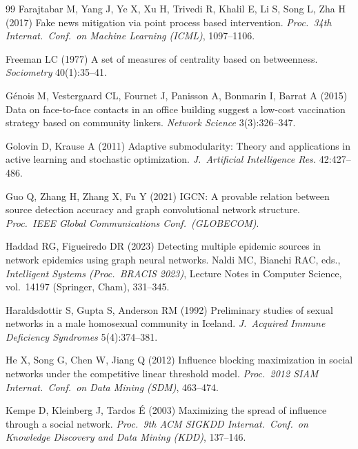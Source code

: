 \documentclass[ASNA,number]{USG}
\begin{document}
\begin{thebibliography}{99}
Farajtabar M, Yang J, Ye X, Xu H, Trivedi R, Khalil E, Li S, Song L, Zha H
  (2017) Fake news mitigation via point process based intervention.
  \emph{Proc.\ 34th Internat.\ Conf.\ on Machine Learning (ICML)},
  1097--1106.

Freeman LC (1977) A set of measures of centrality based on betweenness.
  \emph{Sociometry} 40(1):35--41.

G\'enois M, Vestergaard CL, Fournet J, Panisson A, Bonmarin I, Barrat A
  (2015) Data on face-to-face contacts in an office building suggest a
  low-cost vaccination strategy based on community linkers. \emph{Network
  Science} 3(3):326--347.

Golovin D, Krause A (2011) Adaptive submodularity: Theory and applications
  in active learning and stochastic optimization. \emph{J.\ Artificial
  Intelligence Res.} 42:427--486.

Guo Q, Zhang H, Zhang X, Fu Y (2021) IGCN: A provable relation between
  source detection accuracy and graph convolutional network structure.
  \emph{Proc.\ IEEE Global Communications Conf.\ (GLOBECOM)}.

Haddad RG, Figueiredo DR (2023) Detecting multiple epidemic sources in
  network epidemics using graph neural networks. Naldi MC, Bianchi RAC,
  eds., \emph{Intelligent Systems (Proc.\ BRACIS 2023)}, Lecture Notes in
  Computer Science, vol.\ 14197 (Springer, Cham), 331--345.

Haraldsdottir S, Gupta S, Anderson RM (1992) Preliminary studies of sexual
  networks in a male homosexual community in Iceland. \emph{J.\ Acquired
  Immune Deficiency Syndromes} 5(4):374--381.

He X, Song G, Chen W, Jiang Q (2012) Influence blocking maximization in
  social networks under the competitive linear threshold model.
  \emph{Proc.\ 2012 SIAM Internat.\ Conf.\ on Data Mining (SDM)}, 463--474.

Kempe D, Kleinberg J, Tardos {\'E} (2003) Maximizing the spread of influence
  through a social network. \emph{Proc.\ 9th ACM SIGKDD Internat.\ Conf.\ on
  Knowledge Discovery and Data Mining (KDD)}, 137--146.


\end{thebibliography}
\end{document}
